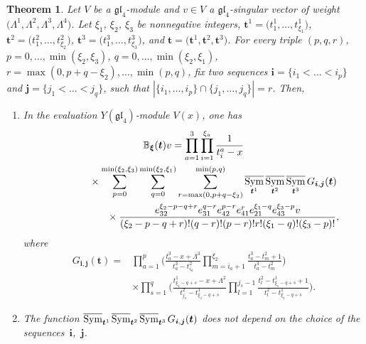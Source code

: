 \documentclass[10pt,a4paper]{amsart}
\numberwithin{equation}{section}
\newtheorem{Theorem}{Theorem}[section]
\DeclareMathOperator{\Symb}{\overline{Sym} }
\begin{document}
\begin{Theorem}\label{main2}
Let $V$ be a $\mathfrak{gl}_4$-module and $v\in V$ a $\mathfrak{gl}_4$-singular vector of weight $\bigl(\Lambda^1,\Lambda^2,\Lambda^3,\Lambda^4\bigr)$. Let $\xi_1$, $\xi_2$, $\xi_3$ be nonnegative integers, $\boldsymbol{t}^1=\bigl(t^1_1,\dots,t^1_{\xi_1}\bigr)$, $\boldsymbol{t}^2=\bigl(t^2_1,\dots,t^2_{\xi_2}\bigr)$, $\boldsymbol{t}^3=\bigl(t^3_1,\dots,t^3_{\xi_3}\bigr)$, and $\boldsymbol{t}=\bigl(\boldsymbol{t}^1,\boldsymbol{t}^2,\boldsymbol{t}^3\bigr)$. For every triple $(p,q,r)$, $p=0,\dots,\min(\xi_2,\xi_3)$, $q=0,\dots,\min(\xi_2,\xi_1)$, $r=\max (0, p+q-\xi_2),\dots,\min(p,q)$, fix two sequences $\boldsymbol{i}=\{i_1<\dots<i_p\}$ and $\boldsymbol{j}=\{j_1<\dots<j_q\}$, such that $|\{i_1,\dots,i_p\}\cap \{j_1,\dots,j_q\}|=r$. Then,
\begin{enumerate}\itemsep=0pt
\item[$(a)$] In the evaluation $Y(\mathfrak{gl}_4)$-module $V(x)$, one has
\begin{gather}
{\mathbb{B}}_{\boldsymbol{\xi}}(\boldsymbol{t}) v =\prod_{a=1}^{3}\prod_{i=1}^{\xi_a}\frac{1}{t^a_i-x} \nonumber\\
 \hphantom{{\mathbb{B}}_{\boldsymbol{\xi}}(\boldsymbol{t}) v =}{}
 \times\sum\limits_{p=0}^{\min(\xi_2,\xi_3)} \sum\limits_{q=0}^{\min(\xi_2,\xi_1)}\sum\limits_{r=\max (0, p+q-\xi_2)}^{\min(p,q)}
 \Symb_{\boldsymbol{t}^1} \Symb_{\boldsymbol{t}^2} \Symb_{\boldsymbol{t}^3} G_{\boldsymbol{i},\boldsymbol{j}}(\boldsymbol{t}) \nonumber\\
 \hphantom{{\mathbb{B}}_{\boldsymbol{\xi}}(\boldsymbol{t}) v =}{}
 \qquad\times\frac{e_{32}^{\xi_2-p-q+r} e_{31}^{q-r} e_{42}^{p-r} e_{41}^{r} e_{21}^{\xi_1-q} e_{43}^{\xi_3-p}v}{(\xi_2-p-q+r)!(q-r)!(p-r)! r!(\xi_1-q)!(\xi_3-p)!}, \label{mainTh2}
\end{gather}
where
\begin{align}
G_{\boldsymbol{i},\boldsymbol{j}}(\boldsymbol{t})={}& \prod_{a=1}^{p} \Biggl(\frac{t^3_a-x+\Lambda^3}{t_a^3-t^2_{i_a}}\prod_{ m=i_a+1}^{\xi_2} \frac{t_a^3-t^2_m+1}{t_a^3-t^2_m} \Biggr) \nonumber\\
&{\times}\prod_{s=1}^{q} \Biggl( \frac{t_{\xi_1-q+s}^1-x+\Lambda^2}{t^2_{j_{s}}-t^1_{\xi_1-q+s}}\prod_{ l=1}^{j_s-1} \frac{t^2_l-t_{\xi_1-q+s}^1+1}{t^2_l-t^1_{\xi_1-q+s}} \Biggr).\label{Gfu}
\end{align}
\item[$(b)$] The function $\Symb_{\boldsymbol{t}^1} \hspace{-0.3pt} \Symb_{\boldsymbol{t}^2}\hspace{-0.3pt} \Symb_{\boldsymbol{t}^3}\hspace{-0.3pt} G_{\boldsymbol{i},\boldsymbol{j}}(\boldsymbol{t})$ does not depend on the choice of the sequences~$\boldsymbol{i}$,~$\boldsymbol{j}$.
\end{enumerate}
\end{Theorem}
\end{document}
